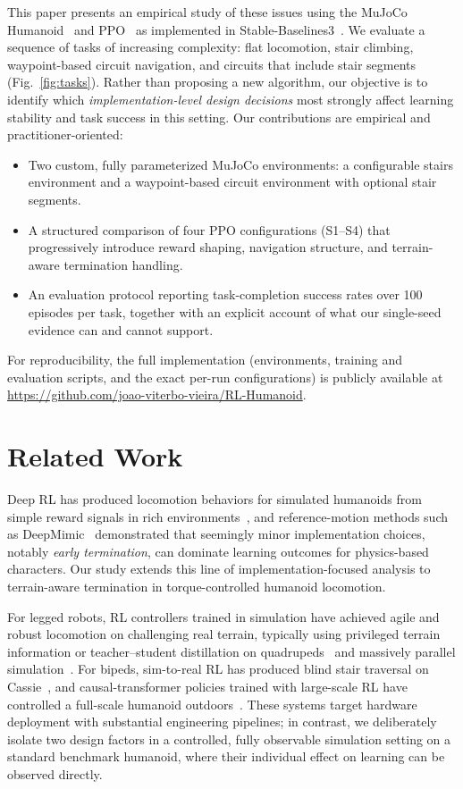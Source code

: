 \documentclass[conference,a4paper]{IEEEtran}
\begin{document}
This paper presents an empirical study of these issues using the MuJoCo Humanoid~\cite{todorov2012mujoco,towers2024gymnasium} and PPO~\cite{schulman2017ppo} as implemented in Stable-Baselines3~\cite{raffin2021sb3}. We evaluate a sequence of tasks of increasing complexity: flat locomotion, stair climbing, waypoint-based circuit navigation, and circuits that include stair segments (Fig.~\ref{fig:tasks}). Rather than proposing a new algorithm, our objective is to identify which \emph{implementation-level design decisions} most strongly affect learning stability and task success in this setting. Our contributions are empirical and practitioner-oriented:
\begin{itemize}
    \item Two custom, fully parameterized MuJoCo environments: a configurable stairs environment and a waypoint-based circuit environment with optional stair segments.
    \item A structured comparison of four PPO configurations (S1--S4) that progressively introduce reward shaping, navigation structure, and terrain-aware termination handling.
    \item An evaluation protocol reporting task-completion success rates over 100 episodes per task, together with an explicit account of what our single-seed evidence can and cannot support.
\end{itemize}
For reproducibility, the full implementation (environments, training and evaluation scripts, and the exact per-run configurations) is publicly available at \url{https://github.com/joao-viterbo-vieira/RL-Humanoid}.

\section{Related Work}
\label{sec:related}

Deep RL has produced locomotion behaviors for simulated humanoids from simple reward signals in rich environments~\cite{heess2017emergence}, and reference-motion methods such as DeepMimic~\cite{peng2018deepmimic} demonstrated that seemingly minor implementation choices, notably \emph{early termination}, can dominate learning outcomes for physics-based characters. Our study extends this line of implementation-focused analysis to terrain-aware termination in torque-controlled humanoid locomotion.

For legged robots, RL controllers trained in simulation have achieved agile and robust locomotion on challenging real terrain, typically using privileged terrain information or teacher--student distillation on quadrupeds~\cite{hwangbo2019agile,lee2020learning,miki2022wild} and massively parallel simulation~\cite{rudin2022minutes,makoviychuk2021isaac}. For bipeds, sim-to-real RL has produced blind stair traversal on Cassie~\cite{siekmann2021stairs}, and causal-transformer policies trained with large-scale RL have controlled a full-scale humanoid outdoors~\cite{radosavovic2024humanoid}. These systems target hardware deployment with substantial engineering pipelines; in contrast, we deliberately isolate two design factors in a controlled, fully observable simulation setting on a standard benchmark humanoid, where their individual effect on learning can be observed directly.
\end{document}
